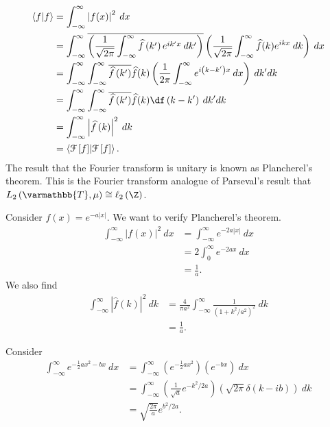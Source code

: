 \documentclass[10pt]{mypackage}
\renewcommand*{\mathbb}[1]{\varmathbb{#1}}
\begin{document}
\begin{align*}
  \braket{f}{f} &= \int_{-\infty}^{\infty} \left\vert f(x) \right\vert^2\:dx\\
                &= \int_{-\infty}^{\infty} \overline{\left(\frac{1}{\sqrt{2\pi}}\int_{-\infty}^{\infty} \widehat{f}\left(k'\right)e^{ik'x}\:dk'\right)} \left(\frac{1}{\sqrt{2\pi}}\int_{-\infty}^{\infty} \widehat{f}(k)e^{ikx}\:dk\right)\:dx\\
                &= \int_{-\infty}^{\infty}\int_{-\infty}^{\infty} \overline{\widehat{f}\left(k'\right)}\widehat{f}(k)\left(\frac{1}{2\pi}\int_{-\infty}^{\infty}e^{i\left(k-k'\right)x}\:dx\right)\:dk' dk\\
                &= \int_{-\infty}^{\infty}\int_{-\infty}^{\infty} \overline{\widehat{f}\left(k'\right)}\widehat{f}(k)\df\left(k-k'\right)\:dk' dk\\
                &= \int_{-\infty}^{\infty} \left\vert \widehat{f}\left(k\right) \right\vert^2\:dk\\
                &= \braket{\mathcal{F}\left[f\right]}{\mathcal{F}\left[f\right]}.
\end{align*}
The result that the Fourier transform is unitary is known as Plancherel's theorem. This is the Fourier transform analogue of Parseval's result that $L_{2}\left(\mathbb{T},\mu\right)\cong \ell_2\left(\Z\right)$.
\begin{example}
  Consider $f(x) = e^{-a|x|}$. We want to verify Plancherel's theorem.
  \begin{align*}
    \int_{-\infty}^{\infty} \left\vert f(x) \right\vert^2\:dx &= \int_{-\infty}^{\infty} e^{-2a|x|}\:dx\\
                                                              &= 2 \int_{0}^{\infty} e^{-2ax}\:dx\\
                                                              &= \frac{1}{a}.
  \end{align*}
  We also find
  \begin{align*}
    \int_{-\infty}^{\infty} \left\vert \widehat{f}(k) \right\vert^2\:dk &= \frac{4}{\pi a^2}\int_{-\infty}^{\infty} \frac{1}{\left(1 + k^2/a^2\right)^2}\:dk\\
                                                                        &= \frac{1}{a}.
  \end{align*}
\end{example}
\begin{example}
  Consider
  \begin{align*}
    \int_{-\infty}^{\infty} e^{-\frac{1}{2}ax^2 - bx}\:dx &= \int_{-\infty}^{\infty} \left(e^{-\frac{1}{2}ax^2}\right)\left(e^{-bx}\right)\:dx\\
                                                          &= \int_{-\infty}^{\infty} \left(\frac{1}{\sqrt{a}}e^{-k^2/2a}\right)\left(\sqrt{2\pi}\delta\left(k-ib\right)\right)\:dk\\
                                                          &= \sqrt{\frac{2\pi}{a}}e^{b^2/2a}.
  \end{align*}
\end{example}
\end{document}
